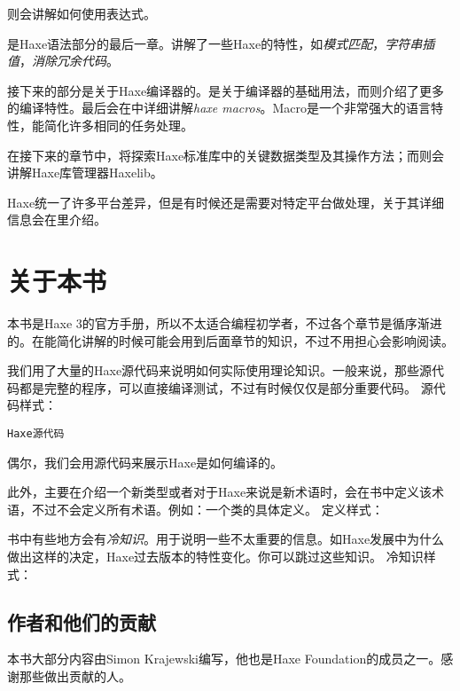 则会讲解如何使用表达式。

是Haxe语法部分的最后一章。讲解了一些Haxe的特性，如\emph{模式匹配}，\emph{字符串插值}，\emph{消除冗余代码}。

接下来的部分是关于Haxe编译器的。是关于编译器的基础用法，而则介绍了更多的编译特性。最后会在中详细讲解\emph{haxe macros}。Macro是一个非常强大的语言特性，能简化许多相同的任务处理。

在接下来的章节中，将探索Haxe标准库中的关键数据类型及其操作方法；而则会讲解Haxe库管理器Haxelib。

Haxe统一了许多平台差异，但是有时候还是需要对特定平台做处理，关于其详细信息会在里介绍。

\section{关于本书}
\label{introduction-about-this-document}

本书是Haxe 3的官方手册，所以不太适合编程初学者，不过各个章节是循序渐进的。在能简化讲解的时候可能会用到后面章节的知识，不过不用担心会影响阅读。

我们用了大量的Haxe源代码来说明如何实际使用理论知识。一般来说，那些源代码都是完整的程序，可以直接编译测试，不过有时候仅仅是部分重要代码。
源代码样式：

\begin{lstlisting}
Haxe源代码
\end{lstlisting}
偶尔，我们会用源代码来展示Haxe是如何编译的。

此外，主要在介绍一个新类型或者对于Haxe来说是新术语时，会在书中定义该术语，不过不会定义所有术语。例如：一个类的具体定义。
定义样式：


书中有些地方会有\emph{冷知识}。用于说明一些不太重要的信息。如Haxe发展中为什么做出这样的决定，Haxe过去版本的特性变化。你可以跳过这些知识。
冷知识样式：


\subsection{作者和他们的贡献}
\label{introduction-authors-and-contributions}

本书大部分内容由Simon Krajewski编写，他也是Haxe Foundation的成员之一。感谢那些做出贡献的人。

